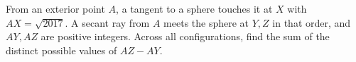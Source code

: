 From an exterior point $A$, a tangent to a sphere touches it at $X$ with $AX=\sqrt{2017}$. A secant ray from $A$ meets the sphere at $Y,Z$ in that order, and $AY,AZ$ are positive integers. Across all configurations, find the sum of the distinct possible values of $AZ-AY$.
